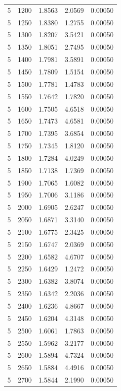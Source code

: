 \begin{longtable}{ccccc}
    5 & 1200 & 1.8563 & 2.0569 & 0.00050 \\
    5 & 1250 & 1.8380 & 1.2755 & 0.00050 \\
    5 & 1300 & 1.8207 & 3.5421 & 0.00050 \\
    5 & 1350 & 1.8051 & 2.7495 & 0.00050 \\
    5 & 1400 & 1.7981 & 3.5891 & 0.00050 \\
    5 & 1450 & 1.7809 & 1.5154 & 0.00050 \\
    5 & 1500 & 1.7781 & 1.4783 & 0.00050 \\
    5 & 1550 & 1.7642 & 1.7820 & 0.00050 \\
    5 & 1600 & 1.7505 & 4.6518 & 0.00050 \\
    5 & 1650 & 1.7473 & 4.6581 & 0.00050 \\
    5 & 1700 & 1.7395 & 3.6854 & 0.00050 \\
    5 & 1750 & 1.7345 & 1.8120 & 0.00050 \\
    5 & 1800 & 1.7284 & 4.0249 & 0.00050 \\
    5 & 1850 & 1.7138 & 1.7369 & 0.00050 \\
    5 & 1900 & 1.7065 & 1.6082 & 0.00050 \\
    5 & 1950 & 1.7006 & 3.1186 & 0.00050 \\
    5 & 2000 & 1.6905 & 2.6247 & 0.00050 \\
    5 & 2050 & 1.6871 & 3.3140 & 0.00050 \\
    5 & 2100 & 1.6775 & 2.3425 & 0.00050 \\
    5 & 2150 & 1.6747 & 2.0369 & 0.00050 \\
    5 & 2200 & 1.6582 & 4.6707 & 0.00050 \\
    5 & 2250 & 1.6429 & 1.2472 & 0.00050 \\
    5 & 2300 & 1.6382 & 3.8074 & 0.00050 \\
    5 & 2350 & 1.6342 & 2.2036 & 0.00050 \\
    5 & 2400 & 1.6236 & 4.8667 & 0.00050 \\
    5 & 2450 & 1.6204 & 4.3148 & 0.00050 \\
    5 & 2500 & 1.6061 & 1.7863 & 0.00050 \\
    5 & 2550 & 1.5962 & 3.2177 & 0.00050 \\
    5 & 2600 & 1.5894 & 4.7324 & 0.00050 \\
    5 & 2650 & 1.5884 & 4.4916 & 0.00050 \\
    5 & 2700 & 1.5844 & 2.1990 & 0.00050 \\

\end{longtable}
